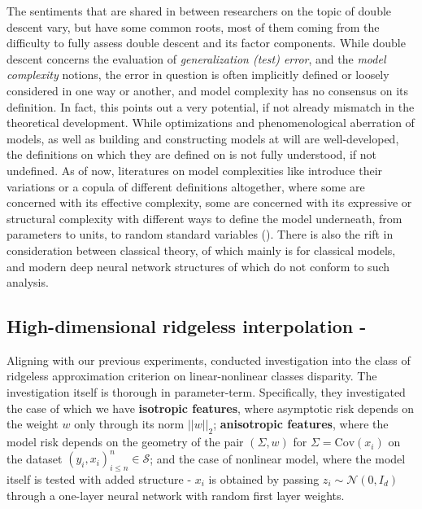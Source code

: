 The sentiments that are shared in between researchers on the topic of double descent vary, but have some common roots, most of them coming from the difficulty to fully assess double descent and its factor components. While double descent concerns the evaluation of \textit{generalization (test) error}, and the \textit{model complexity} notions, the error in question is often implicitly defined or loosely considered in one way or another, and model complexity has no consensus on its definition. In fact, this points out a very potential, if not already mismatch in the theoretical development. While optimizations and phenomenological aberration of models, as well as building and constructing models at will are well-developed, the definitions on which they are defined on is not fully understood, if not undefined. As of now, literatures on model complexities like \cite{modelcomplex_exp,hu_model_2021,janik2021complexitydeepneuralnetworks,truong2025rademachercomplexitybasedgeneralizationbounds,luo2024investigatingimpactmodelcomplexity} introduce their variations or a copula of different definitions altogether, where some are concerned with its effective complexity, some are concerned with its expressive or structural complexity with different ways to define the model underneath, from parameters to units, to random standard variables (\cite{neal2018modern}). There is also the rift in consideration between classical theory, of which mainly is for classical models, and modern deep neural network structures of which do not conform to such analysis.

\subsection{High-dimensional ridgeless interpolation - \cite{hastie2019surprises}}
Aligning with our previous experiments, \cite{hastie2019surprises} conducted investigation into the class of ridgeless approximation criterion on linear-nonlinear classes disparity. The investigation itself is thorough in parameter-term. Specifically, they investigated the case of which we have \textbf{isotropic features}, where asymptotic risk depends on the weight $w$ only through its norm $||w||_{2}$; \textbf{anisotropic features}, where the model risk depends on the geometry of the pair $(\Sigma, w)$ for $\Sigma = \mathrm{Cov}(x_{i})$ on the dataset $(y_{i},x_{i})^{n}_{i\leq n}\in\mathcal{S}$; and the case of nonlinear model, where the model itself is tested with added structure - $x_{i}$ is obtained by passing $z_{i}\sim\mathcal{N}(0,I_d)$ through a one-layer neural network with random first layer weights.  

